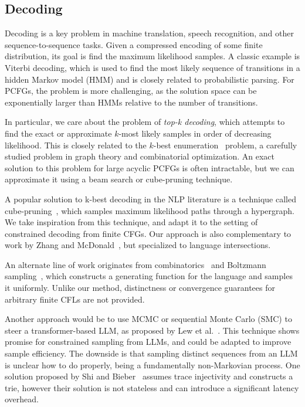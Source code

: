 \documentclass[runningheads]{llncs}
\begin{document}
  \subsection{Decoding}

Decoding is a key problem in machine translation, speech recognition, and other sequence-to-sequence tasks. Given a compressed encoding of some finite distribution, its goal is find the maximum likelihood samples. A classic example is Viterbi decoding, which is used to find the most likely sequence of transitions in a hidden Markov model (HMM) and is closely related to probabilistic parsing. For PCFGs, the problem is more challenging, as the solution space can be exponentially larger than HMMs relative to the number of transitions.

In particular, we care about the problem of \textit{top-k decoding}, which attempts to find the exact or approximate $k$-most likely samples in order of decreasing likelihood. This is closely related to the $k$-best enumeration~\cite{eppstein2014k} problem, a carefully studied problem in graph theory and combinatorial optimization. An exact solution to this problem for large acyclic PCFGs is often intractable, but we can approximate it using a beam search or cube-pruning technique.

A popular solution to k-best decoding in the NLP literature is a technique called cube-pruning~\cite{huang2005better,huang2007forest,chiang2007hierarchical}, which samples maximum likelihood paths through a hypergraph. We take inspiration from this technique, and adapt it to the setting of constrained decoding from finite CFGs. Our approach is also complementary to work by Zhang and McDonald~\cite{zhang2012generalized}, but specialized to language intersections.

  An alternate line of work originates from combinatorics~\cite{hickey1983uniform,gore1997quasi} and Boltzmann sampling~\cite{duchon2004boltzmann}, which constructs a generating function for the language and samples it uniformly. Unlike our method, distinctness or convergence guarantees for arbitrary finite CFLs are not provided.

  Another approach would be to use MCMC or sequential Monte Carlo (SMC) to steer a transformer-based LLM, as proposed by Lew et al.~\cite{lew2023sequential}. This technique shows promise for constrained sampling from LLMs, and could be adapted to improve sample efficiency. The downside is that sampling distinct sequences from an LLM is unclear how to do properly, being a fundamentally non-Markovian process. One solution proposed by Shi and Bieber~\cite{shi2020incremental} assumes trace injectivity and constructs a trie, however their solution is not stateless and can introduce a significant latency overhead.
\end{document}
